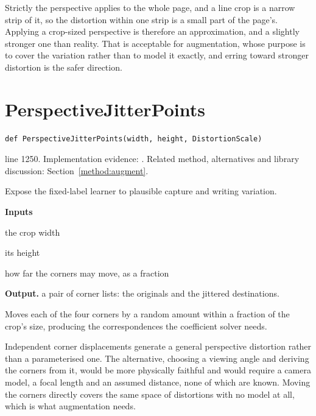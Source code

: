Strictly the perspective applies to the whole page, and a line crop is a narrow strip of it, so the distortion within one strip is a small part of the page's. Applying a crop-sized perspective is therefore an approximation, and a slightly stronger one than reality. That is acceptable for augmentation, whose purpose is to cover the variation rather than to model it exactly, and erring toward stronger distortion is the safer direction.



\section{PerspectiveJitterPoints}\label{fn:train:PerspectiveJitterPoints}
\begin{lstlisting}[style=sig]
def PerspectiveJitterPoints(width, height, DistortionScale)
\end{lstlisting}
 line 1250. Implementation evidence: \cite{code2026}. Related method, alternatives and library discussion: Section~\ref{method:augment}.


Expose the fixed-label learner to plausible capture and writing variation.




\noindent\textbf{Inputs}
\begin{description}[leftmargin=2.2em,style=nextline,font=\normalfont\ttfamily]\setlength\itemsep{1pt}
  \item[{width}] \normalfont the crop width
  \item[{height}] \normalfont its height
  \item[{DistortionScale}] \normalfont how far the corners may move, as a fraction
\end{description}

\noindent\textbf{Output.} a pair of corner lists: the originals and the jittered destinations.


Moves each of the four corners by a random amount within a fraction of the crop's size, producing the correspondences the coefficient solver needs.


Independent corner displacements generate a general perspective distortion rather than a parameterised one. The alternative, choosing a viewing angle and deriving the corners from it, would be more physically faithful and would require a camera model, a focal length and an assumed distance, none of which are known. Moving the corners directly covers the same space of distortions with no model at all, which is what augmentation needs.


